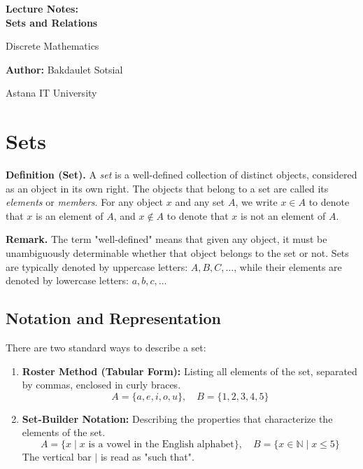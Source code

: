 \documentclass[11pt,a4paper]{article}
\begin{document}
\begin{titlepage}
    \centering
    \vspace*{4cm}
    
    {\Huge\bfseries Lecture Notes:\\ Sets and Relations\par}
    \vspace{1cm}
    {\Large Discrete Mathematics\par}
    \vspace{2cm}
    {\large \textbf{Author:} Bakdaulet Sotsial\par}
    \vspace{1cm}
    
    \vfill
    {\small Astana IT University \par}
    \vspace*{2cm}
\end{titlepage}

\tableofcontents
\newpage

\section{Sets}

\textbf{Definition (Set).} A \textit{set} is a well-defined collection of distinct objects, considered as an object in its own right. The objects that belong to a set are called its \textit{elements} or \textit{members}. For any object $x$ and any set $A$, we write $x \in A$ to denote that $x$ is an element of $A$, and $x \notin A$ to denote that $x$ is not an element of $A$.

\textbf{Remark.} The term "well-defined" means that given any object, it must be unambiguously determinable whether that object belongs to the set or not. Sets are typically denoted by uppercase letters: $A, B, C, \dots$, while their elements are denoted by lowercase letters: $a, b, c, \dots$

\subsection{Notation and Representation}

There are two standard ways to describe a set:

\begin{enumerate}[label=(\arabic*)]
    \item \textbf{Roster Method (Tabular Form):} Listing all elements of the set, separated by commas, enclosed in curly braces.
    \begin{equation*}
        A = \{a, e, i, o, u\}, \quad B = \{1, 2, 3, 4, 5\}
    \end{equation*}
    
    \item \textbf{Set-Builder Notation:} Describing the properties that characterize the elements of the set.
    \begin{equation*}
        A = \{x \mid x \text{ is a vowel in the English alphabet}\}, \quad B = \{x \in \mathbb{N} \mid x \leq 5\}
    \end{equation*}
    The vertical bar $\mid$ is read as "such that".
\end{enumerate}
\end{document}
